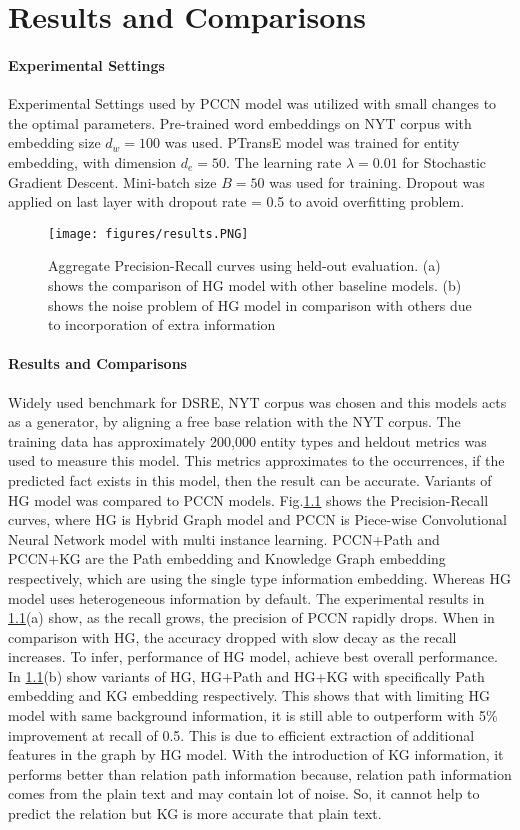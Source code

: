 \chapter{Results and Comparisons}
\label{ch:resultscomparisons}


\subsubsection{Experimental Settings}
Experimental Settings used by PCCN model\cite{zeng2016incorporating} was utilized with small changes to the optimal parameters. Pre-trained word embeddings on NYT corpus with embedding size $d_w = 100$ was used. PTransE model was trained for entity embedding, with dimension $d_e = 50$. The learning rate $\lambda = 0.01$ for Stochastic Gradient Descent. Mini-batch size $B = 50$ was used for training. Dropout was applied on last layer with dropout rate = 0.5 to avoid overfitting problem.

\begin{figure}[h!]
	\centering
	\texttt{[image: figures/results.PNG]}
	\caption{Aggregate Precision-Recall curves using held-out evaluation. (a) shows the comparison of HG model with other baseline models. (b) shows the noise problem of HG model in comparison with others due to incorporation of extra information}
	\label{fig:results}
\end{figure}

\subsubsection{Results and Comparisons}
Widely used benchmark for DSRE, NYT corpus was chosen and this models acts as a generator, by aligning a free base relation with the NYT corpus. The training data has approximately 200,000 entity types and heldout metrics was used to measure this model. This metrics approximates to the occurrences, if the predicted fact exists in this model, then the result can be accurate. Variants of HG model was compared to PCCN models. Fig.\ref{fig:results} shows the Precision-Recall curves, where HG is Hybrid Graph model and PCCN is Piece-wise Convolutional Neural Network model with multi instance learning. PCCN+Path and PCCN+KG are the Path embedding and Knowledge Graph embedding respectively, which are using the single type information embedding. Whereas HG model uses heterogeneous information by default. The experimental results in \ref{fig:results}(a) show, as the recall grows, the precision of PCCN rapidly drops. When in comparison with HG, the accuracy dropped with slow decay as the recall increases. To infer, performance of HG model, achieve best overall performance. In \ref{fig:results}(b) show variants of HG, HG+Path and HG+KG with specifically Path embedding and KG embedding respectively. This shows that with limiting HG model with same background information, it is still able to outperform with 5\% improvement at recall of 0.5. This is due to efficient extraction of additional features in the graph by HG model. With the introduction of KG information, it performs better than relation path information because, relation path information comes from the plain text and may contain lot of noise. So, it cannot help to predict the relation but KG is more accurate that plain text. 